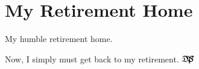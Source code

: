 \documentclass{article}
\def\dps{$\hbox{$\mathfrak D$\kern-.3em\hbox{$\mathfrak P$}%
   \kern-.6em \hbox{$\mathcal S$}}$}
\begin{document}
\newpage

\section{My \textbf{Retirement} Home}\label{retirement}

My humble retirement \hypertarget{retire}{home}.
\begin{flushleft}
\quad {}
\end{flushleft}


\newtopic\noindent
Now, I simply must get back to my retirement. \dps
\end{document}

